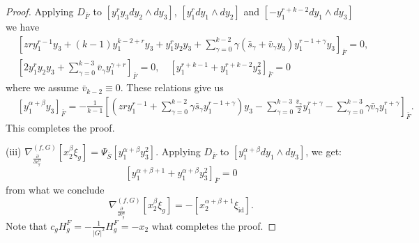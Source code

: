 \documentclass[reqno,12pt]{amsart}
\numberwithin{equation}{section}
\theoremstyle{plain}
\theoremstyle{definition}
\newcommand{\id}{\mathrm{id}}
\numberwithin{equation}{section}
\begin{document}
\begin{proof}
Applying $D_{\bar{F}}$ to $[y_1^{r}y_3 dy_2\wedge dy_3]$, $[y_1^{r} dy_1 \wedge dy_2]$ and $[-y_1^{r+k-2} dy_1 \wedge dy_3]$ we have
\begin{align*}
    & [z r y_1^{r-1}y_3 + (k-1)y_1^{k-2+r}y_3 + y_1^{r}y_2y_3 + \sum_{\gamma=0}^{k-2} \gamma(\bar s_\gamma + \bar v_\gamma y_3) y_1^{r-1+\gamma}y_3]_{\bar{F}} = 0,
    \\
    & [2y_1^{r}y_2y_3 + \sum_{\gamma=0}^{k-3} \bar{v}_\gamma y_1^{\gamma +r}]_{\bar{F}} = 0, \quad [y_1^{r+k-1} + y_1^{r+k-2} y_3^2]_{\bar{F}}  = 0
\end{align*}
where we assume $\bar{v}_{k-2} \equiv 0$.
These relations give us
\begin{align*}
    &[y_1^{\alpha + \beta}y_3]_{\bar{F}} = -\frac{1}{k-1} [(z r y_1^{r-1} + \sum_{\gamma=0}^{k-2} \gamma \bar s_\gamma y_1^{r-1+\gamma} )y_3
    - \sum_{\gamma=0}^{k-3} \frac{\bar v_{\gamma}}{2} y_1^{r+\gamma} 
     - \sum_{\gamma=0}^{k-3} \gamma \bar v_\gamma y_1^{r+\gamma}]_{\bar{F}}.
\end{align*}
This completes the proof.

% 

(iii) $\nabla_{\frac{\partial}{\partial v^\alpha_{g}}}^{(f,G)}[x_2^\beta\xi_{g}] = \Psi_{\bar{S}}[y_1^{\alpha+\beta}y_3^2]$.
Applying $D_{\bar{F}}$ to $[y_1^{\alpha+\beta}dy_1\wedge dy_3]$, we get:
\[
[y_1^{\alpha+\beta+1} + y_1^{\alpha+\beta}y_3^2]_{\bar{F}} = 0
\]
from what we conclude
\[
\nabla_{\frac{\partial}{\partial v^\alpha_{g}}}^{(f,G)}[x_2^\beta\xi_{g}] = - [x_2^{\alpha+\beta+1}\xi_{\id}].
\]
Note that $c_gH_{g}^F = -\frac{1}{|G|^2}H_{g}^F = -x_2$ what completes the proof.
\end{proof}
\end{document}
